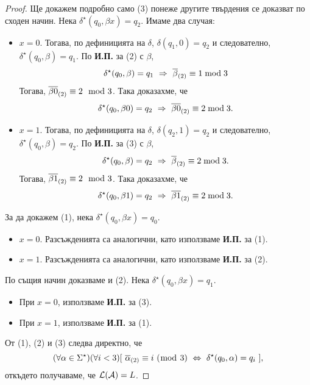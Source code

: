 \begin{proof}
  Ще докажем подробно само (3) понеже другите твърдения се доказват по сходен начин.
  Нека $\delta^\star(q_0,\beta x) = q_2$. 
  Имаме два случая:
  \begin{itemize}
  \item 
    $x = 0$. 
    Тогава, по дефиницията на $\delta$, 
    $\delta(q_1,0) = q_2$ и следователно, $\delta^\star(q_0,\beta) = q_1$.
    По {\bf И.П.} за (2) с $\beta$,
    \[\delta^\star(q_0,\beta) = q_1\ \Rightarrow\ \bin{\beta} \equiv 1 \bmod 3\]
    Тогава, $\overline{\beta0}_{(2)} \equiv 2 \mod 3$. Така доказахме, че
    \[\delta^\star(q_0,\beta 0) = q_2\ \Rightarrow\ \overline{\beta 0}_{(2)} \equiv 2 \bmod 3.\]
  \item
    $x = 1$.
    Тогава, по дефиницията на $\delta$, $\delta(q_2,1) = q_2$ и следователно,
    $\delta^\star(q_0,\beta) = q_2$.
    По {\bf И.П.} за (3) с $\beta$,
    \[\delta^\star(q_0,\beta) = q_2\ \Rightarrow\ \bin{\beta} \equiv 2 \bmod 3.\]
    Тогава, $\overline{\beta1}_{(2)} \equiv 2 \mod 3$. Така доказахме, че
    \[\delta^\star(q_0,\beta 1) = q_2\ \Rightarrow\ \overline{\beta 1}_{(2)} \equiv 2 \bmod 3.\]
  \end{itemize}
  За да докажем (1), нека $\delta^\star(q_0,\beta x) = q_0$. 
  \begin{itemize}
  \item 
    $x = 0$. Разсъжденията са аналогични, като използваме {\bf И.П.} за (1).
  \item
    $x = 1$. Разсъжденията са аналогични, като използваме {\bf И.П.} за (2).
  \end{itemize}
  
  По същия начин доказваме и (2). Нека $\delta^\star(q_0,\beta x) = q_1$. 
  \begin{itemize}
  \item 
    При $x = 0$, използваме {\bf И.П.} за (3).
  \item
    При $x = 1$, използваме {\bf И.П.} за (1).
  \end{itemize}
  От (1), (2) и (3) следва директно, че
  \[(\forall\alpha\in\Sigma^\star)(\forall i < 3)[\ \bin{\alpha} \equiv i\ (\bmod\ 3)\ \Leftrightarrow\ \delta^\star(q_0,\alpha) = q_i\ ],\]
  откъдето получаваме, че $\mathcal{L}(\mathcal{A}) = L$.
\end{proof}



